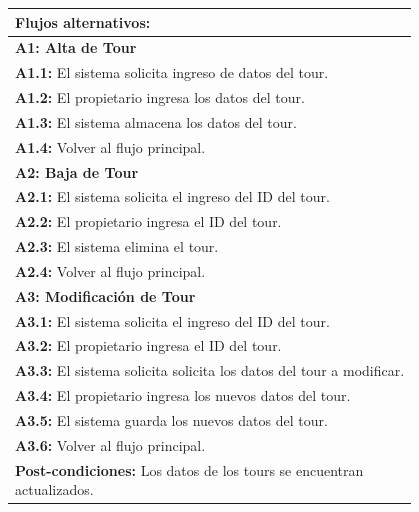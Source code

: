 \documentclass[12pt,a4paper,titlepage,oneside]{article}
\begin{document}
\begin{tabular}{| l | p{0.8\linewidth} |}
	\multicolumn{2}{|p{0.8\linewidth}|}{\textbf{Flujos alternativos:}	}\\ 			     \hline
	\multicolumn{2}{|p{0.8\linewidth}|}{\textbf{A1: Alta de Tour}} \\ \hline
	\multicolumn{2}{|p{0.8\linewidth}|}{\textbf{A1.1:} El sistema solicita ingreso de datos del tour.} \\ \hline
	\multicolumn{2}{|p{0.8\linewidth}|}{\textbf{A1.2:} El propietario ingresa los datos del tour.
	} \\ \hline
	\multicolumn{2}{|p{0.8\linewidth}|}{\textbf{A1.3:} El sistema almacena los datos del tour.
	} \\ \hline
	\multicolumn{2}{|p{0.8\linewidth}|}{\textbf{A1.4:} Volver al flujo principal.
	} \\ \hline
		\multicolumn{2}{|p{0.8\linewidth}|}{\textbf{A2: Baja de Tour}} \\ \hline
	\multicolumn{2}{|p{0.8\linewidth}|}{\textbf{A2.1:} El sistema solicita el ingreso del ID del tour.} \\ \hline
	\multicolumn{2}{|p{0.8\linewidth}|}{\textbf{A2.2:} El propietario ingresa el ID del tour. 
	} \\ \hline
	\multicolumn{2}{|p{0.8\linewidth}|}{\textbf{A2.3:} El sistema elimina el tour.
	} \\ \hline
	\multicolumn{2}{|p{0.8\linewidth}|}{\textbf{A2.4:} Volver al flujo principal.
	} \\ \hline
		\multicolumn{2}{|p{0.8\linewidth}|}{\textbf{A3: Modificación de Tour}} \\ \hline
	\multicolumn{2}{|p{0.8\linewidth}|}{\textbf{A3.1:} El sistema solicita el ingreso del ID del tour.} \\ \hline
	\multicolumn{2}{|p{0.8\linewidth}|}{\textbf{A3.2:} El propietario ingresa el ID del tour. 
	} \\ \hline
	\multicolumn{2}{|p{0.8\linewidth}|}{\textbf{A3.3:} El sistema solicita solicita los datos del tour a modificar.
	} \\ \hline
	\multicolumn{2}{|p{0.8\linewidth}|}{\textbf{A3.4:} El propietario ingresa los nuevos datos del tour.
	} \\ \hline
		\multicolumn{2}{|p{0.8\linewidth}|}{\textbf{A3.5:} El sistema guarda los nuevos datos del tour.
	} \\ \hline
	\multicolumn{2}{|p{0.8\linewidth}|}{\textbf{A3.6:} Volver al flujo principal.
	} \\ \hline
		\multicolumn{2}{|p{0.8\linewidth}|}{\textbf{Post-condiciones:} Los datos de los tours se encuentran actualizados.}\\ \hline


\end{tabular} \\\\
\\\\\\\\
\end{document}
